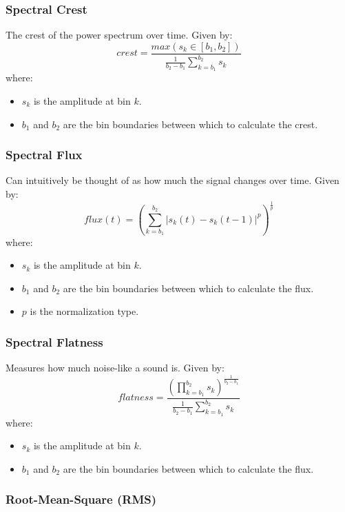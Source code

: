 \documentclass[a4paper, 12pt, twoside]{report}
\begin{document}
\subsubsection{Spectral Crest}
\label{sec:org25d762a}

    The crest of the power spectrum over time. Given by:
        \[ crest = \frac{max(s_{k}\in[b_{1}, b_{2}])}{\frac{1}{b_{2} - b_{1}}\sum^{b_{2}}_{k=b_{1}}s_{k}} \]
    where:
    \begin{itemize}
      \item $s_{k}$ is the amplitude at bin $k$.
      \item $b_{1}$ and $b_{2}$ are the bin boundaries between which to calculate the crest.
    \end{itemize}
\subsubsection{Spectral Flux}
\label{sec:org8d3ce71}

    Can intuitively be thought of as how much the signal changes over time. Given by:
        \[ flux(t) = (\sum^{b_{2}}_{k=b_{1}}|s_{k}(t)-s_{k}(t-1)|^{p})^{\frac{1}{p}} \]
    where:
    \begin{itemize}
      \item $s_{k}$ is the amplitude at bin $k$.
      \item $b_{1}$ and $b_{2}$ are the bin boundaries between which to calculate the flux.
      \item $p$ is the normalization type.
    \end{itemize}

\subsubsection{Spectral Flatness}
\label{sec:org06c8a6d}

    Measures how much noise-like a sound is. Given by:
        \[ flatness = \frac{(\prod^{b_{2}}_{k=b_{1}}s_{k})^{\frac{1}{b_{2}-b_{1}}}}{\frac{1}{b_{2}-b_{1}}\sum^{b_{2}}_{k=b_{1}}s_{k}} \]
    where:
    \begin{itemize}
      \item $s_{k}$ is the amplitude at bin $k$.
      \item $b_{1}$ and $b_{2}$ are the bin boundaries between which to calculate the flux.
    \end{itemize}
\subsubsection{Root-Mean-Square (RMS)}
\label{sec:orgb1f5108}
\end{document}
